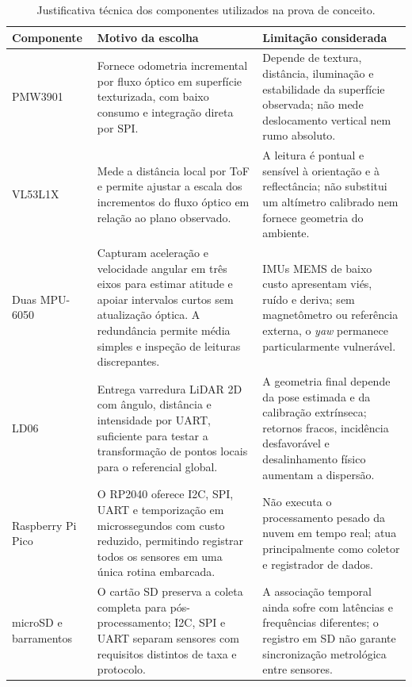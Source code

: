 \begin{table}[htbp]
    \centering
    \caption{Justificativa técnica dos componentes utilizados na prova de conceito.}
    \label{tab:justificativa_componentes}
    \small
    \begin{tabularx}{\textwidth}{@{}l X X@{}}
        \toprule
        \textbf{Componente} & \textbf{Motivo da escolha} & \textbf{Limitação considerada} \\
        \midrule
        PMW3901 & Fornece odometria incremental por fluxo óptico em superfície texturizada, com baixo consumo e integração direta por SPI. & Depende de textura, distância, iluminação e estabilidade da superfície observada; não mede deslocamento vertical nem rumo absoluto. \\
        VL53L1X & Mede a distância local por ToF e permite ajustar a escala dos incrementos do fluxo óptico em relação ao plano observado. & A leitura é pontual e sensível à orientação e à reflectância; não substitui um altímetro calibrado nem fornece geometria do ambiente. \\
        Duas MPU-6050 & Capturam aceleração e velocidade angular em três eixos para estimar atitude e apoiar intervalos curtos sem atualização óptica. A redundância permite média simples e inspeção de leituras discrepantes. & IMUs MEMS de baixo custo apresentam viés, ruído e deriva; sem magnetômetro ou referência externa, o \textit{yaw} permanece particularmente vulnerável. \\
        LD06 & Entrega varredura LiDAR 2D com ângulo, distância e intensidade por UART, suficiente para testar a transformação de pontos locais para o referencial global. & A geometria final depende da pose estimada e da calibração extrínseca; retornos fracos, incidência desfavorável e desalinhamento físico aumentam a dispersão. \\
        Raspberry Pi Pico & O RP2040 oferece I2C, SPI, UART e temporização em microssegundos com custo reduzido, permitindo registrar todos os sensores em uma única rotina embarcada. & Não executa o processamento pesado da nuvem em tempo real; atua principalmente como coletor e registrador de dados. \\
        microSD e barramentos & O cartão SD preserva a coleta completa para pós-processamento; I2C, SPI e UART separam sensores com requisitos distintos de taxa e protocolo. & A associação temporal ainda sofre com latências e frequências diferentes; o registro em SD não garante sincronização metrológica entre sensores. \\
        \bottomrule
    \end{tabularx}
\end{table}

